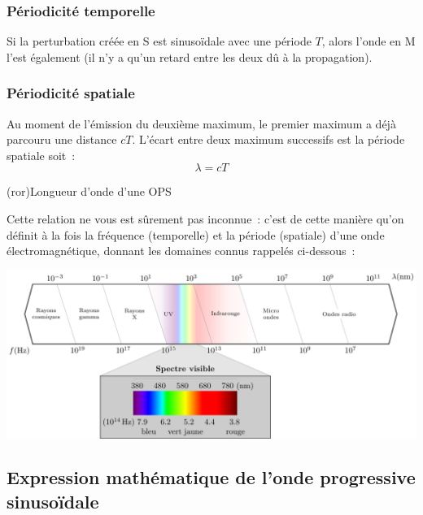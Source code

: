 \documentclass[../../main/main.tex]{subfiles}
\begin{document}
\subsubsection{Périodicité temporelle}
Si la perturbation créée en S est sinusoïdale avec une période $T$, alors l'onde
en M l'est également (il n'y a qu'un retard entre les deux dû à la propagation).

\subsubsection{Périodicité spatiale}

Au moment de l'émission du deuxième maximum, le premier maximum a déjà parcouru
une distance $cT$. L'écart entre deux maximum successifs est la période spatiale
soit~:
\[\lambda = cT\]

\begin{tcb}(ror){Longueur d'onde d'une OPS}
\end{tcb}

Cette relation ne vous est sûrement pas inconnue~: c'est de cette manière qu'on
définit à la fois la fréquence (temporelle) et la période (spatiale) d'une onde
électromagnétique, donnant les domaines connus rappelés ci-dessous~:

\begin{center}
	\includegraphics[width=\linewidth]{full_spectre}
\end{center}

\subsection{Expression mathématique de l'onde progressive sinusoïdale}
\end{document}
